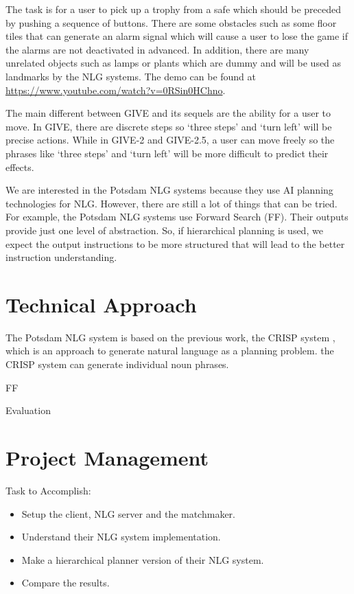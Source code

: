 \documentclass[11pt]{article} %
\begin{document}
The task is for a user to pick up a trophy from a safe which should be preceded by pushing a sequence of buttons. There are some obstacles such as some floor tiles that can generate an alarm signal which will cause a user to lose the game if the alarms are not deactivated in advanced. In addition, there are many unrelated objects such as lamps or plants which are dummy and will be used as landmarks by the NLG systems. The demo can be found at \url{https://www.youtube.com/watch?v=0RSin0HChno}.

The main different between GIVE and its sequels are the ability for a user to move. In GIVE, there are discrete steps so `three steps' and `turn left' will be precise actions. While in GIVE-2 and GIVE-2.5, a user can move freely so the phrases like `three steps' and `turn left' will be more difficult to predict their effects.

We are interested in the Potsdam NLG systems \cite{garoufi2011potsdam} because they use AI planning technologies for NLG. However, there are still a lot of things that can be tried. For example, the Potsdam NLG systems use Forward Search (FF). Their outputs provide just one level of abstraction. So, if hierarchical planning is used, we expect the output instructions to be more structured that will lead to the better instruction understanding.

\section{Technical Approach}

The Potsdam NLG system \cite{garoufi2011combining, garoufi2011potsdam, garoufi2014generation} is based on the previous work, the CRISP system \cite{crisp07}, which is an approach to generate natural language as a planning problem. the CRISP system can generate individual noun phrases. 

FF

Evaluation

\section{Project Management}

Task to Accomplish:
\begin{itemize}
  \item Setup the client, NLG server and the matchmaker.
  \item Understand their NLG system implementation.
  \item Make a hierarchical planner version of their NLG system.
  \item Compare the results.
\end{itemize}
\end{document}
